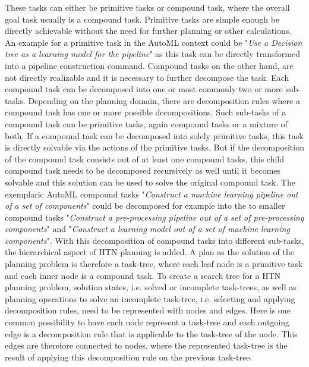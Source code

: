 These tasks can either be primitive tasks or compound task, where the overall goal task usually is a compound task.
Primitive tasks are simple enough be directly achievable without the need for further planning or other calculations.
An example for a primitive task in the AutoML context could be "\textit{Use a Decision tree as a learning model for the pipeline}" as this task can be directly transformed into a pipeline construction command.\newline
Compound tasks on the other hand, are not directly realizable and it is necessary to further decompose the task.
Each compound task can be decomposed into one or most commonly two or more sub-tasks.
Depending on the planning domain, there are decomposition rules where a compound task has one or more possible decompositions.
Such sub-tasks of a compound task can be primitive tasks, again compound tasks or a mixture of both.
If a compound task can be decomposed into solely primitive tasks, this task is directly solvable via the actions of the primitive tasks.
But if the decomposition of the compound task consists out of at least one compound tasks, this child compound task needs to be decomposed recursively as well until it becomes solvable and this solution can be used to solve the original compound task.
The exemplaric AutoML compound tasks "\textit{Construct a machine learning pipeline out of a set of components}" could be decomposed for example into the to smaller compound tasks "\textit{Construct a pre-processing pipeline out of a set of pre-processing components}" and "\textit{Construct a learning model out of a set of machine learning components}".\newline
With this decomposition of compound tasks into different sub-tasks, the hierarchical aspect of HTN planning is added.
A plan as the solution of the planning problem is therefore a task-tree, where each leaf node is a primitive task and each inner node is a compound task.
To create a search tree for a HTN planning problem, solution states, i.e. solved or incomplete task-trees, as well as planning operations to solve an incomplete task-tree, i.e. selecting and applying decomposition rules, need to be represented with nodes and edges.\newline
Here is one common possibility to have each node represent a task-tree and each outgoing edge is a decomposition rule that is applicable to the task-tree of the node.
This edges are therefore connected to nodes, where the represented task-tree is the result of applying this decomposition rule on the previous task-tree.
